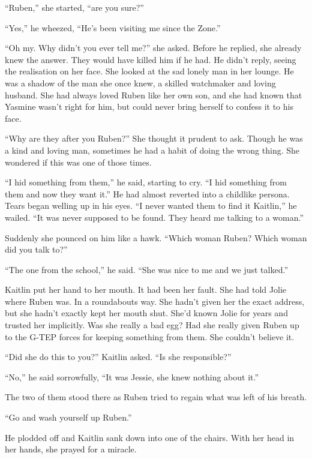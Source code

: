 ``Ruben,'' she started, ``are you sure?''

``Yes,'' he wheezed, ``He's been visiting me since the Zone.''

``Oh my.  Why didn't you ever tell me?'' she asked.  Before he replied, she already knew the answer.  They would have killed him if he had.  He didn't reply, seeing the realisation on her face.  She looked at the sad lonely man in her lounge.  He was a shadow of the man she once knew, a skilled watchmaker and loving husband.  She had always loved Ruben like her own son, and she had known that Yasmine wasn't right for him, but could never bring herself to confess it to his face.

``Why are they after you Ruben?''  She thought it prudent to ask.  Though he was a kind and loving man, sometimes he had a habit of doing the wrong thing.  She wondered if this was one of those times.  

``I hid something from them,'' he said, starting to cry.  ``I hid something from them and now they want it.''  He had almost reverted into a childlike persona.  Tears began welling up in his eyes.  ``I never wanted them to find it Kaitlin,'' he wailed.  ``It was never supposed to be found.  They heard me talking to a woman.''

Suddenly she pounced on him like a hawk.  ``Which woman Ruben?  Which woman did you talk to?''  

``The one from the school,'' he said.  ``She was nice to me and we just talked.''  

Kaitlin put her hand to her mouth.  It had been her fault.  She had told Jolie where Ruben was.  In a roundabouts way.  She hadn't given her the exact address, but she hadn't exactly kept her mouth shut.  She'd known Jolie for years and trusted her implicitly.  Was she really a bad egg?  Had she really given Ruben up to the G-TEP forces for keeping something from them.  She couldn't believe it.

``Did she do this to you?'' Kaitlin asked.  ``Is she responsible?''

``No,'' he said sorrowfully, ``It was Jessie, she knew nothing about it.''

The two of them stood there as Ruben tried to regain what was left of his breath.  

``Go and wash yourself up Ruben.''

He plodded off and Kaitlin sank down into one of the chairs.  With her head in her hands, she prayed for a miracle.



